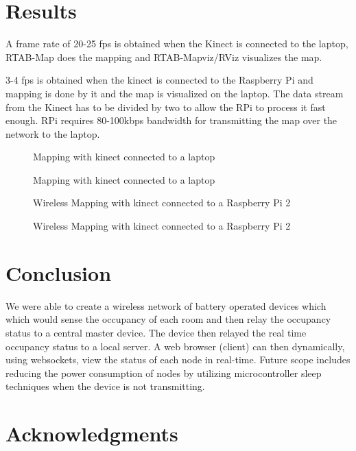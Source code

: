 \documentclass[journal]{IEEEtran}
\begin{document}
\section{Results}
A frame rate of 20-25 fps is obtained when the Kinect is connected to the laptop, RTAB-Map does the mapping and RTAB-Mapviz/RViz visualizes the map. 

3-4 fps is obtained when the kinect is connected to the Raspberry Pi and mapping is done by it and the map is visualized on the laptop. The data stream from the Kinect has to be divided by two to allow the RPi to process it fast enough. RPi requires 80-100kbps bandwidth for transmitting the map over the network to the laptop.

\begin{figure}[ht]
\centering
\caption{Mapping with kinect connected to a laptop}
\label{fig_sim}
\end{figure}
 
\begin{figure}[ht]
	\centering
	\caption{Mapping with kinect connected to a laptop}
	\label{fig_sim}
\end{figure}

\newpage

\begin{figure}[ht]
	\centering
	\caption{Wireless Mapping with kinect connected to a Raspberry Pi 2}
	\label{fig_sim}
\end{figure}

\begin{figure}[ht]
	\centering
	\caption{Wireless Mapping with kinect connected to a Raspberry Pi 2}
	\label{fig_sim}
\end{figure}

\section{Conclusion}
We were able to create a wireless network of battery operated devices which which would  sense the occupancy of each room and then relay the occupancy status to a central master device. The device then relayed the real time occupancy status to a local server. A web browser (client) can then dynamically, using websockets, view the status of each node in real-time.
Future scope includes reducing the power consumption of nodes by utilizing microcontroller sleep techniques when the device is not transmitting.

\section*{Acknowledgments}
\end{document}
